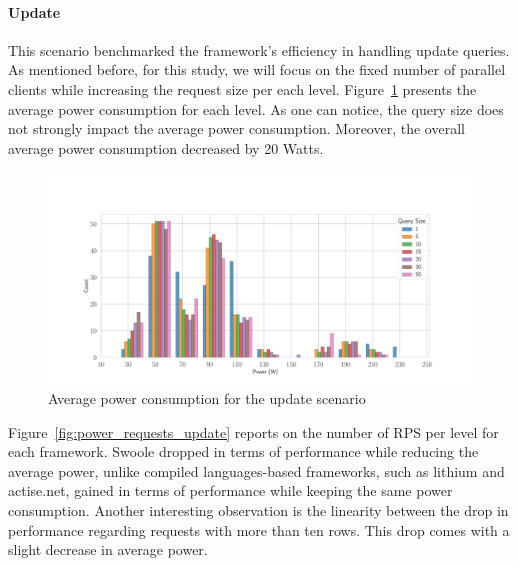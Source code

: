 \paragraph{Update}
This scenario benchmarked the framework's efficiency in handling update queries.
As mentioned before, for this study, we will focus on the fixed number of parallel clients while increasing the request size per each level.
Figure~\ref{fig:av_power_update} presents the average power consumption for each level.
As one can notice, the query size does not strongly impact the average power consumption.
Moreover, the overall average power consumption decreased by 20 Watts.

\begin{figure}[hbt]
    \centering
    \includegraphics[width=\textwidth,height=\textheight,keepaspectratio]{imgs/histogram_av_power_cpu_update}
    \caption{Average power consumption for the update scenario}
    \label{fig:av_power_update}
\end{figure}

Figure~\ref{fig:power_requests_update} reports on the number of RPS per level for each framework.
Swoole dropped in terms of performance while reducing the average power, unlike compiled languages-based frameworks, such as lithium and actise.net, gained in terms of performance while keeping the same power consumption.
Another interesting observation is the linearity between the drop in performance regarding requests with more than ten rows.
This drop comes with a slight decrease in average power.

